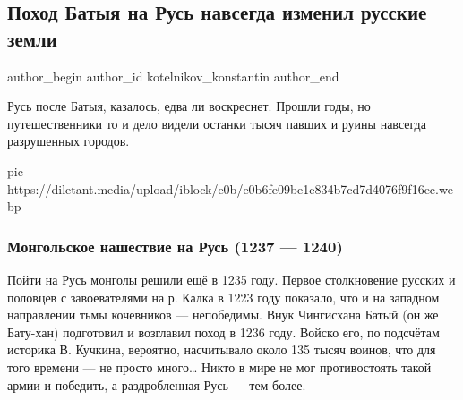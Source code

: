  
 
 
 
 
 
\subsection{Поход Батыя на Русь навсегда изменил русские земли}
\label{sec:11_12_2020.sites.ru.diletant_media.kotelnikov_konstantin.1.poxod_batyja_russia}
\ifcmt
	author_begin
   author_id kotelnikov_konstantin
	author_end
\fi

Русь после Батыя, казалось, едва ли воскреснет. Прошли годы, но путешественники
то и дело видели останки тысяч павших и руины навсегда разрушенных городов.



\ifcmt
  pic https://diletant.media/upload/iblock/e0b/e0b6fe09be1e834b7cd7d4076f9f16ec.webp
\fi

\subsubsection{Монгольское нашествие на Русь (1237 — 1240)}

Пойти на Русь монголы решили ещё в 1235 году. Первое столкновение русских и
половцев с завоевателями на р. Калка в 1223 году показало, что и на западном
направлении тьмы кочевников — непобедимы. Внук Чингисхана Батый (он же
Бату-хан) подготовил и возглавил поход в 1236 году. Войско его, по подсчётам
историка В. Кучкина, вероятно, насчитывало около 135 тысяч воинов, что для того
времени — не просто много… Никто в мире не мог противостоять такой армии и
победить, а раздробленная Русь — тем более.

